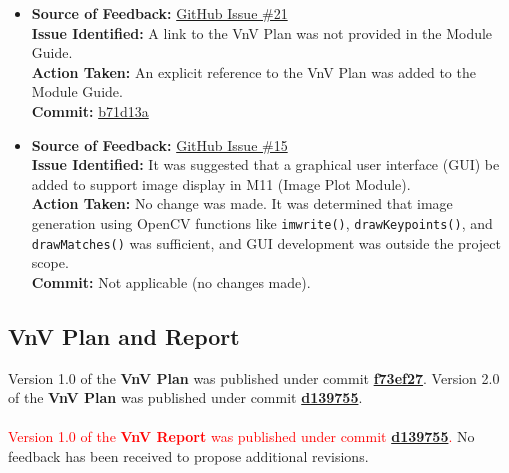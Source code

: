 \documentclass{article}
\begin{document}
\begin{itemize}
  \item \textbf{Source of Feedback:} \href{https://github.com/KiranSingh15/CAS-741-Image-Correspondences/issues/21}{GitHub Issue \#21} \\
  \textbf{Issue Identified:} A link to the VnV Plan was not provided in the Module Guide. \\
  \textbf{Action Taken:} An explicit reference to the VnV Plan was added to the Module Guide. \\
  \textbf{Commit:} \href{https://github.com/KiranSingh15/CAS-741-Image-Correspondences/commit/b71d13a22a609f3a48efb7fa22a8fe5f681868c5}{b71d13a}

  \item \textbf{Source of Feedback:} \href{https://github.com/KiranSingh15/CAS-741-Image-Correspondences/issues/15}{GitHub Issue \#15} \\
  \textbf{Issue Identified:} It was suggested that a graphical user interface (GUI) be added to support image display in M11 (Image Plot Module). \\
  \textbf{Action Taken:} No change was made. It was determined that image generation using OpenCV functions like \texttt{imwrite()}, \texttt{drawKeypoints()}, and \texttt{drawMatches()} was sufficient, and GUI development was outside the project scope. \\
  \textbf{Commit:} Not applicable (no changes made).

\end{itemize}




\subsection{VnV Plan and Report}
\noindent Version 1.0 of the \textbf{VnV Plan} was published under commit \href{https://github.com/KiranSingh15/CAS-741-Image-Correspondences/commit/f73ef273ec0e440c47bb849f142982482d895bc0}{\textbf{f73ef27}}. Version 2.0 of the \textbf{VnV Plan} was published under commit \href{https://github.com/KiranSingh15/CAS-741-Image-Correspondences/commit/d139755d96b3c7b316cd7f96106ef69df3ab228a}{\textbf{d139755}}.\\ \\

\noindent \textcolor{red}{Version 1.0 of the \textbf{VnV Report} was published under commit \href{https://github.com/KiranSingh15/CAS-741-Image-Correspondences/commit/d139755d96b3c7b316cd7f96106ef69df3ab228a}{\textbf{d139755}}.} No feedback has been received to propose additional revisions.
\end{document}

